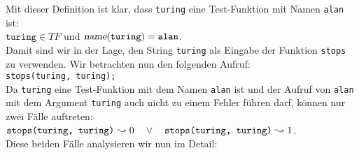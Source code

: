 Mit dieser Definition ist klar, dass \texttt{turing} eine Test-Funktion mit Namen \texttt{alan} ist: \\[0.3cm]
\hspace*{1.3cm} $\texttt{turing} \in T\!F$ \quad und \quad $\textsl{name}(\texttt{turing}) = \texttt{alan}$. 
\\[0.3cm]
Damit sind wir in der Lage, den String \texttt{turing} als Eingabe der Funktion \texttt{stops}
zu verwenden.  Wir betrachten nun den folgenden Aufruf: \\[0.3cm]
\hspace*{1.3cm} \texttt{stops(\texttt{turing}, \texttt{turing});} \\[0.3cm]
Da \texttt{turing} eine Test-Funktion mit dem Namen \texttt{alan} ist und der Aufruf von \texttt{alan} mit dem Argument \texttt{turing}
auch nicht zu einem Fehler führen darf, können nur zwei Fälle auftreten:
\\[0.1cm]
\hspace*{1.3cm} 
$\texttt{stops(\texttt{turing}, \texttt{turing})} \leadsto 0 \quad \vee\quad
 \texttt{stops(\texttt{turing}, \texttt{turing})} \leadsto 1$. \\[0.1cm]
Diese beiden Fälle analysieren wir nun im Detail:
